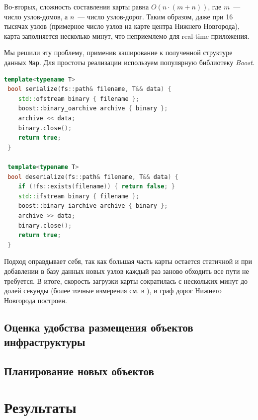 \documentclass[11pt]{article}
\begin{document}
	Во-вторых, сложность составления карты равна $ O(n \cdot (m + n)) $, где $ m $~--- число узлов-домов, а $ n $~--- число узлов-дорог.
	Таким образом, даже при 16 тысячах узлов (примерное число узлов на карте центра Нижнего Новгорода), карта заполняется несколько минут, что неприемлемо для real-time приложения.
	
	Мы решили эту проблему, применив кэширование к полученной структуре данных \texttt{Map}.
	Для простоты реализации используем популярную библиотеку \textit{Boost}.
	
	\begin{lstlisting}[language=C++]
 template<typename T>
 bool serialize(fs::path& filename, T&& data) {
	std::ofstream binary { filename };
	boost::binary_oarchive archive { binary };
	archive << data;
	binary.close();
	return true;
 }

 template<typename T>
 bool deserialize(fs::path& filename, T&& data) {
	if (!fs::exists(filename)) { return false; }
	std::ifstream binary { filename };
	boost::binary_iarchive archive { binary };
	archive >> data;
	binary.close();
	return true;
 }
	\end{lstlisting}
	
	Подход оправдывает себя, так как большая часть карты остается статичной и при добавлении в базу данных новых узлов каждый раз заново обходить все пути не требуется.
	В итоге, скорость загрузки карты сократилась с нескольких минут до долей секунды (более точные измерения см. в ), и граф дорог Нижнего Новгорода построен.
	
    \subsection{Оценка удобства размещения объектов инфраструктуры}
    
    \subsection{Планирование новых объектов}
    
    \section{Результаты}\label{section:results}
	
	\pagebreak
\end{document}
